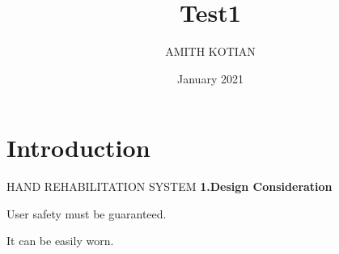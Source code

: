 \documentclass{beamer}
\title{Test1}
\author{AMITH KOTIAN}
\date{January 2021}
\newcommand{\chaptype}[1]{{#1}}
\begin{document}
\maketitle

\section{Introduction}
   \begin{frame}{HAND REHABILITATION SYSTEM}
    \chaptype{ \LARGE \textbf {1.Design Consideration}}
        \vspace*{0.5cm}
        \begin{itemize}
        \setlength{\itemsep}{3mm}
            \begin{Large}
            \item User safety must be guaranteed.
            \item It can be easily worn.
           \end{Large}
      \end{itemize}
    \end{frame}
\end{document}
